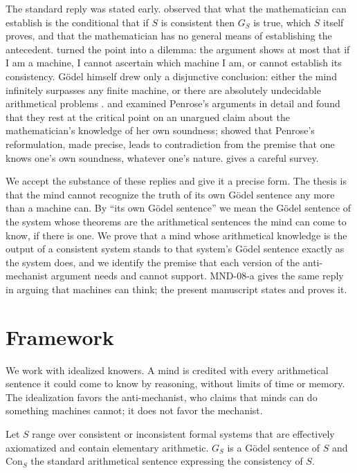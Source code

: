 \documentclass{situationist-preprint}
\begin{document}
The standard reply was stated early. \citet{Putnam1960} observed that what the mathematician can establish is the conditional that if $S$ is consistent then $G_S$ is true, which $S$ itself proves, and that the mathematician has no general means of establishing the antecedent. \citet{Benacerraf1967} turned the point into a dilemma: the argument shows at most that if I am a machine, I cannot ascertain which machine I am, or cannot establish its consistency. G\"odel himself drew only a disjunctive conclusion: either the mind infinitely surpasses any finite machine, or there are absolutely undecidable arithmetical problems \citep{Godel1951}. \citet{Feferman1995} and \citet{Shapiro1998} examined Penrose's arguments in detail and found that they rest at the critical point on an unargued claim about the mathematician's knowledge of her own soundness; \citet{Chalmers1995} showed that Penrose's reformulation, made precise, leads to contradiction from the premise that one knows one's own soundness, whatever one's nature. \citet{Franzen2005} gives a careful survey.

We accept the substance of these replies and give it a precise form. The thesis is that the mind cannot recognize the truth of its own G\"odel sentence any more than a machine can. By ``its own G\"odel sentence'' we mean the G\"odel sentence of the system whose theorems are the arithmetical sentences the mind can come to know, if there is one. We prove that a mind whose arithmetical knowledge is the output of a consistent system stands to that system's G\"odel sentence exactly as the system does, and we identify the premise that each version of the anti-mechanist argument needs and cannot support. MND-08-a gives the same reply in arguing that machines can think; the present manuscript states and proves it.

\section{Framework}

We work with idealized knowers. A mind is credited with every arithmetical sentence it could come to know by reasoning, without limits of time or memory. The idealization favors the anti-mechanist, who claims that minds can do something machines cannot; it does not favor the mechanist.

\begin{definition}\label{d:sent}
Let $S$ range over consistent or inconsistent formal systems that are effectively axiomatized and contain elementary arithmetic. $G_S$ is a G\"odel sentence of $S$ and $\mathrm{Con}_S$ the standard arithmetical sentence expressing the consistency of $S$.
\end{definition}
\end{document}
